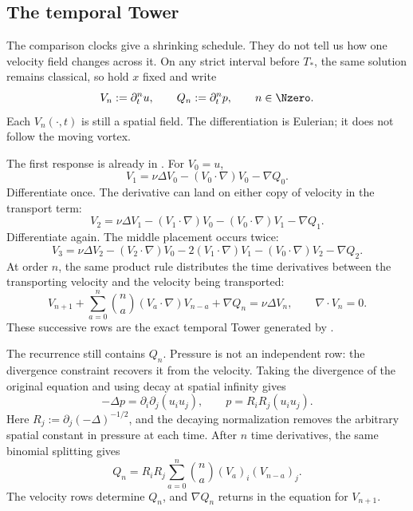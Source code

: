 \subsection{The temporal Tower}\label{sub:BodyFiniteTimeResponseEscalation}

The comparison clocks give a shrinking schedule.
They do not tell us how one velocity field changes across it.
On any strict interval before \(T_*\), the same solution remains classical, so hold \(x\) fixed and write
\begin{equation}\label{eq:TemporalTowerDefinitionBody}
  V_n:=\partial_t^nu,
  \qquad
  Q_n:=\partial_t^np,
  \qquad
  n\in\Nzero.
\end{equation}
Each \(V_n(\cdot,t)\) is still a spatial field.
The differentiation is Eulerian; it does not follow the moving vortex.

The first response is already in \NavierStokes{}.
For \(V_0=u\),
\[
  V_1
  =\nu\Delta V_0
  -(V_0\cdot\nabla)V_0
  -\nabla Q_0.
\]
Differentiate once.
The derivative can land on either copy of velocity in the transport term:
\[
  V_2
  =\nu\Delta V_1
  -(V_1\cdot\nabla)V_0
  -(V_0\cdot\nabla)V_1
  -\nabla Q_1.
\]
Differentiate again.
The middle placement occurs twice:
\[
  V_3
  =\nu\Delta V_2
  -(V_2\cdot\nabla)V_0
  -2(V_1\cdot\nabla)V_1
  -(V_0\cdot\nabla)V_2
  -\nabla Q_2.
\]
At order \(n\), the same product rule distributes the time derivatives between the transporting velocity and the velocity being transported:
\begin{equation}\label{eq:BodyTemporalVelocityRecurrence}
  V_{n+1}
  +\sum_{a=0}^{n}\binom{n}{a}(V_a\cdot\nabla)V_{n-a}
  +\nabla Q_n
  =\nu\Delta V_n,
  \qquad
  \nabla\cdot V_n=0.
\end{equation}
These successive rows are the exact temporal Tower generated by \NavierStokes{}.

The recurrence still contains \(Q_n\).
Pressure is not an independent row: the divergence constraint recovers it from the velocity.
Taking the divergence of the original equation and using decay at spatial infinity gives
\begin{equation}\label{eq:PressureNormalization}
  -\Delta p=\partial_i\partial_j(u_i u_j),
  \qquad
  p=R_iR_j(u_i u_j).
\end{equation}
Here \(R_j:=\partial_j(-\Delta)^{-1/2}\), and the decaying normalization removes the arbitrary spatial constant in pressure at each time.
After \(n\) time derivatives, the same binomial splitting gives
\begin{equation}\label{eq:BodyTemporalPressureRecurrence}
  Q_n
  =R_iR_j
  \sum_{a=0}^{n}\binom{n}{a}
  (V_a)_i(V_{n-a})_j.
\end{equation}
The velocity rows determine \(Q_n\), and \(\nabla Q_n\) returns in the equation for \(V_{n+1}\).

